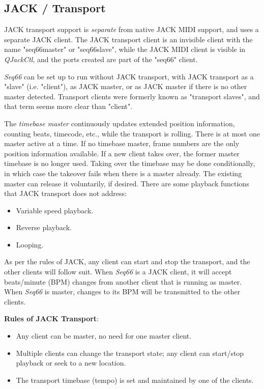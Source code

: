 \subsection{JACK / Transport}
\label{subsec:jack_transport}

   JACK transport support is \textsl{separate} from native JACK MIDI support,
   and uses a separate JACK client.
   The JACK transport client is an invisible client with the
   name "seq66master" or "seq66slave", while the JACK MIDI client is visible in
   \textsl{QJackCtl}, and the ports created are part of the
   "seq66" client.

   \textsl{Seq66} can be set up to run without JACK transport, with JACK
   transport as a "slave" (i.e. "client"), as JACK master, or as JACK master if
   there is no other master detected.
   Transport clients were formerly known as "transport slaves", and that
   term seems more clear than "client".

   The \textsl{timebase master}
   continuously updates extended position information, counting beats,
   timecode, etc., while the transport is rolling.
   There is at most one master active at a time. If no
   timebase master, frame numbers are the only position information available.
   If a new client takes over, the former master timebase is no longer used.
   Taking over the timebase may be done conditionally, in which case the takeover
   fails when there is a master already. The existing master can release it
   voluntarily, if desired.
   There are some playback functions that JACK transport does not address:

   \begin{itemize}
      \item Variable speed playback.
      \item Reverse playback.
      \item Looping.
   \end{itemize}

   As per the rules of JACK, any client can start and stop the transport, and
   the other clients will follow suit.  When \textsl{Seq66} is a JACK client,
   it will accept beats/minute (BPM) changes from another client that is
   running as master.  When \textsl{Seq66} is master, changes to its BPM will
   be transmitted to the other clients.

   \textbf{Rules of JACK Transport}:

   \begin{itemize}
      \item Any client can be master, no need for one master client.
      \item Multiple clients can change the transport state;
         any client can start/stop playback or seek to a new location.
      \item The transport timebase (tempo) is set and maintained by
         one of the clients.
   \end{itemize}

